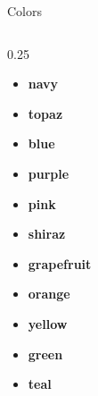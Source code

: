 \begin{frame}[t]{Colors}
\begin{columns}[T, onlytextwidth]
\begin{column}{0.25\textwidth}
\begin{itemize}
        \item \textcolor{tud navy}{\textbf{navy}}
        \item \textcolor{tud topaz}{\textbf{topaz}}
        \item \textcolor{tud blue}{\textbf{blue}}
        \item \textcolor{tud purple}{\textbf{purple}}
        \item \textcolor{tud pink}{\textbf{pink}}
        \item \textcolor{tud shiraz}{\textbf{shiraz}}
        \item \textcolor{tud grapefruit}{\textbf{grapefruit}}
        \item \textcolor{tud orange}{\textbf{orange}}
        \item \textcolor{tud yellow}{\textbf{yellow}}
        \item \textcolor{tud green}{\textbf{green}}
        \item \textcolor{tud teal}{\textbf{teal}}
      \end{itemize}
    \end{column}
  \end{columns}
\end{frame}